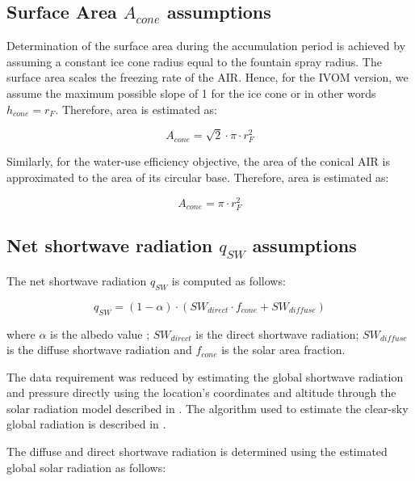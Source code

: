 \documentclass[tc, manuscript]{copernicus}
\begin{document}
\subsection{Surface Area $A_{cone}$ assumptions}

Determination of the surface area during the accumulation period is achieved by assuming a constant ice cone
radius equal to the fountain spray radius. The surface area scales the freezing rate of the AIR. Hence, for the
IVOM version, we assume the maximum possible slope of 1 for the ice cone or in other words $h_{cone} = r_{F}$.
Therefore, area is estimated as:  

\begin{equation} A_{cone} =\sqrt{2} \cdot \pi \cdot r_{F}^2  \end{equation}

Similarly, for the water-use efficiency objective, the area of the conical AIR is approximated to the area of
its circular base. Therefore, area is estimated as:

\begin{equation} A_{cone} =\pi \cdot r_{F}^2  \end{equation}

\subsection{Net shortwave radiation \texorpdfstring{$q_{SW}$}{Lg} assumptions}
\label{sec:SW}

The net shortwave radiation $q_{SW}$ is computed as follows:

\begin{equation} 
q_{SW} = (1- \alpha) \cdot ( SW_{direct} \cdot f_{cone} + SW_{diffuse})
\label{eqn:SW} 
\end{equation}

where $\alpha$ is the albedo value ; $SW_{direct}$ is the direct shortwave radiation; $SW_{diffuse}$ is the
diffuse shortwave radiation and $f_{cone}$ is the solar area fraction.

The data requirement was reduced by estimating the global shortwave radiation and pressure directly using the
location's coordinates and altitude through the solar radiation model described in
\citet{holmgrenPvlibPythonPython2018}. The algorithm used to estimate the clear-sky global radiation is
described in \citet{ineichenBroadbandSimplifiedVersion2008}.  

The diffuse and direct shortwave radiation is determined using the estimated global solar radiation as follows:
\end{document}
